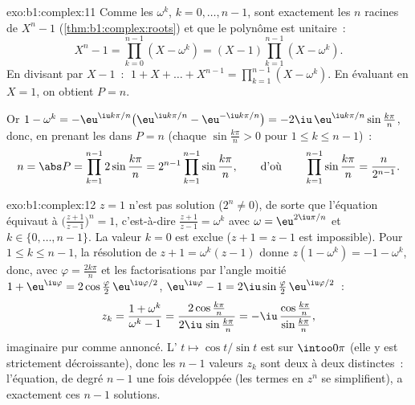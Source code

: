 \begin{solution}{exo:b1:complex:11}
Comme les $\omega^k$, $k = 0, \dots, n-1$, sont exactement les $n$
racines de $X^n - 1$ (\cref{thm:b1:complex:roots}) et que le polynôme
est unitaire~:
\[
X^n - 1 = \prod_{k=0}^{n-1} (X - \omega^k)
= (X - 1) \prod_{k=1}^{n-1} (X - \omega^k).
\]
En divisant par $X - 1$~: $\;1 + X + \dots + X^{n-1} =
\prod_{k=1}^{n-1} (X - \omega^k)$. En évaluant en $X = 1$, on obtient
$P = n$.

Or $1 - \omega^k = -\eu^{\iu k\pi/n}\bigl(\eu^{\iu k\pi/n} -
\eu^{-\iu k\pi/n}\bigr) = -2\iu\,\eu^{\iu k\pi/n} \sin\frac{k\pi}{n}$,
donc, en prenant les  dans $P = n$ (chaque $\sin\frac{k\pi}n >
0$ pour $1 \leq k \leq n-1$)~:
\[
n = \abs P = \prod_{k=1}^{n-1} 2\sin\frac{k\pi}{n}
= 2^{n-1} \prod_{k=1}^{n-1} \sin\frac{k\pi}{n},
\qquad\text{d'où}\qquad
\prod_{k=1}^{n-1} \sin\frac{k\pi}{n} = \frac{n}{2^{n-1}} .
\]
\end{solution}

\begin{solution}{exo:b1:complex:12}
$z = 1$ n'est pas solution ($2^n \neq 0$), de sorte que l'équation
équivaut à $\bigl(\frac{z+1}{z-1}\bigr)^n = 1$, c'est-à-dire
$\frac{z+1}{z-1} = \omega^k$ avec $\omega = \eu^{2\iu\pi/n}$ et
$k \in \{0, \dots, n-1\}$. La valeur $k = 0$ est exclue ($z + 1 =
z - 1$ est impossible). Pour $1 \leq k \leq n - 1$, la résolution de
$z + 1 = \omega^k(z - 1)$ donne $z(1 - \omega^k) = -1 - \omega^k$,
donc, avec $\varphi = \frac{2k\pi}{n}$ et les factorisations par
l'angle moitié $1 + \eu^{\iu\varphi} = 2\cos\frac\varphi2\,
\eu^{\iu\varphi/2}$, $\eu^{\iu\varphi} - 1 = 2\iu\sin\frac\varphi2
\,\eu^{\iu\varphi/2}$~:
\[
z_k = \frac{1 + \omega^k}{\omega^k - 1}
= \frac{2\cos\frac{k\pi}{n}}{2\iu\,\sin\frac{k\pi}{n}}
= -\iu\,\frac{\cos\frac{k\pi}{n}}{\sin\frac{k\pi}{n}} ,
\]
imaginaire pur comme annoncé. L' $t \mapsto \cos t/\sin t$
est  sur $\intoo0\pi$ (elle y est strictement décroissante),
donc les $n - 1$ valeurs $z_k$ sont deux à deux distinctes~:
l'équation, de degré $n - 1$ une fois développée (les termes en $z^n$
se simplifient), a exactement ces $n - 1$ solutions.
\end{solution}

